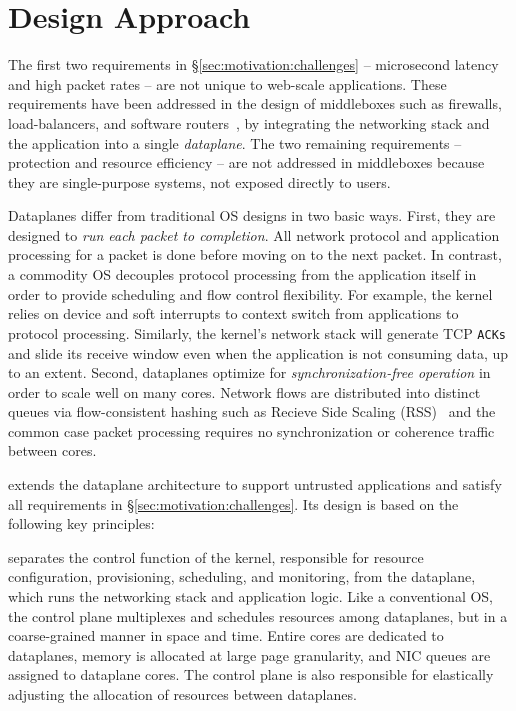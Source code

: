 \section{\ix Design Approach}
\label{sec:design}

The first two requirements in \S\ref{sec:motivation:challenges} --
microsecond latency and high packet rates -- are not unique to
web-scale applications. These requirements have been addressed in the
design of middleboxes such as firewalls, load-balancers, and software
routers~\cite{routebricks,click}, by integrating the networking stack
and the application into a single \emph{dataplane}. The two remaining
requirements -- protection and resource efficiency -- are not
addressed in middleboxes because they are single-purpose systems, not
exposed directly to users.

Dataplanes differ from traditional OS designs in two basic
ways. First, they are designed to \emph{run each packet to
  completion}. All network protocol and application processing for a
packet is done before moving on to the next packet.  In contrast, a
commodity OS decouples protocol processing from the application itself
in order to provide scheduling and flow control flexibility.  For
example, the kernel relies on device and soft interrupts to context
switch from applications to protocol processing. Similarly, the
kernel's network stack will generate TCP \texttt{ACKs} and slide its
receive window even when the application is not consuming data, up to
an extent. Second, dataplanes optimize for \emph{synchronization-free
  operation} in order to scale well on many cores. Network flows are
distributed into distinct queues via flow-consistent hashing such as
Recieve Side Scaling (RSS)~\cite{url:rss} and the common case packet processing requires no
synchronization or coherence traffic between cores.

\ix extends the dataplane architecture to support untrusted
applications and satisfy all requirements in
\S\ref{sec:motivation:challenges}. Its design is based on the
following key principles:


 \ix
separates the control function of the kernel, responsible for resource
configuration, provisioning, scheduling, and monitoring, from the
dataplane, which runs the networking stack and application logic.
Like a conventional OS, the control plane multiplexes and schedules
resources among dataplanes, but in a coarse-grained manner in space
and time. Entire cores are dedicated to dataplanes, memory is
allocated at large page granularity, and NIC queues are assigned to
dataplane cores. The control plane is also responsible for elastically
adjusting the allocation of resources between dataplanes.

